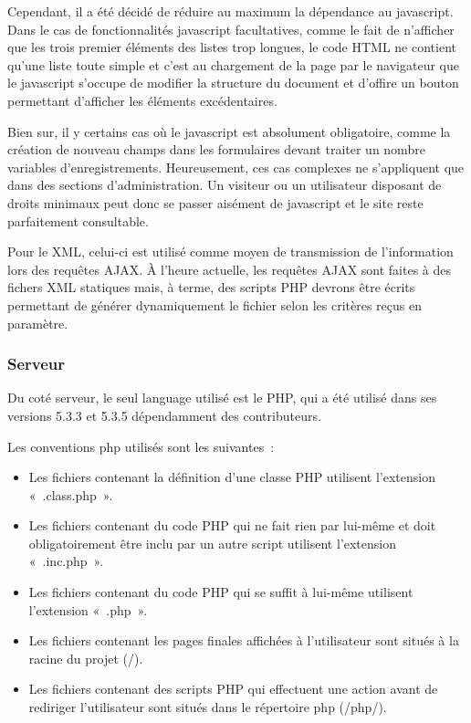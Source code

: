 \documentclass[letter, 10pt]{report}
\begin{document}
Cependant, il a été décidé de réduire au maximum la dépendance au javascript. Dans le cas de fonctionnalités javascript facultatives, comme le fait de n'afficher que les trois premier éléments des listes trop longues, le code HTML ne contient qu'une liste toute simple et c'est au chargement de la page par le navigateur que le javascript s'occupe de modifier la structure du document et d'offire un bouton permettant d'afficher les éléments excédentaires.

Bien sur, il y certains cas où le javascript est absolument obligatoire, comme la création de nouveau champs dans les formulaires devant traiter un nombre variables d'enregistrements. Heureusement, ces cas complexes ne s'appliquent que dans des sections d'administration. Un visiteur ou un utilisateur disposant de droits minimaux peut donc se passer aisément de javascript et le site reste parfaitement consultable.

Pour le XML, celui-ci est utilisé comme moyen de transmission de l'information lors des requêtes AJAX. À l'heure actuelle, les requêtes AJAX sont faites à des fichers XML statiques mais, à terme, des scripts PHP devrons être écrits permettant de générer dynamiquement le fichier selon les critères reçus en paramètre.

\subsubsection{Serveur}
Du coté serveur, le seul language utilisé est le PHP, qui a été utilisé dans ses versions 5.3.3 et 5.3.5 dépendamment des contributeurs.

Les conventions php utilisés sont les suivantes~:

\begin{itemize}
\item Les fichiers contenant la définition d'une classe PHP utilisent l'extension «~.class.php~».
\item Les fichiers contenant du code PHP qui ne fait rien par lui-même et doit obligatoirement être inclu par un autre script utilisent l'extension «~.inc.php~».
\item Les fichiers contenant du code PHP qui se suffit à lui-même utilisent l'extension «~.php~».
\item Les fichiers contenant les pages finales affichées à l'utilisateur sont situés à la racine du projet (/).
\item Les fichiers contenant des scripts PHP qui effectuent une action avant de rediriger l'utilisateur sont situés dans le répertoire php (/php/).
\end{itemize}
\end{document}
